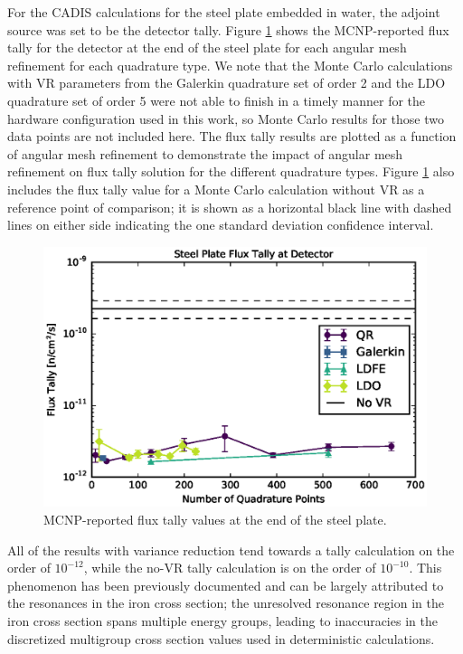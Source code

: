 \documentclass{article} %
\begin{document}
For the CADIS calculations for the steel plate embedded in water, the adjoint
source was set to be the detector tally. Figure \ref{steel-cad-tally} shows
the MCNP-reported flux tally for the detector at the end of the steel plate
for each angular mesh refinement for each quadrature type. We note that the
Monte Carlo calculations with VR parameters from the Galerkin quadrature
set of order 2 and the LDO quadrature set of order 5 were not able to finish
in a timely manner for the hardware configuration used in this work, so Monte
Carlo results for those two data points are not included here. The flux tally
results are plotted as a function of angular mesh refinement to demonstrate
the impact of angular mesh refinement on flux tally solution for the different
quadrature types. Figure \ref{steel-cad-tally} also includes the flux tally
value for a Monte Carlo calculation without VR as a reference point of
comparison; it is shown as a horizontal black line with dashed lines on either
side indicating the one standard deviation confidence interval.

\begin{figure}[!hbt]
\centering
\includegraphics[max height=0.445\textheight]{steel-cadis-tally.eps}
\caption{MCNP-reported flux tally values at the end of the steel plate.}
\label{steel-cad-tally}
\end{figure}

All of the results with variance reduction tend towards a tally calculation on
the order of $10^{-12}$, while the no-VR tally calculation is on the order
of $10^{-10}$. This phenomenon has been previously documented
\cite{wilsonslaybaugh} and can be largely attributed to the resonances in the
iron cross section; the unresolved resonance region in the iron cross section
spans multiple energy groups, leading to inaccuracies in the discretized
multigroup cross section values used in deterministic calculations.
\end{document}
